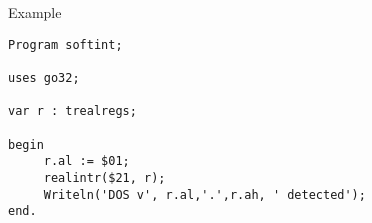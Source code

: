 \begin{FPCList}
\item[Example]
\begin{verbatim}
Program softint;

uses go32;

var r : trealregs;

begin
     r.al := $01;
     realintr($21, r);
     Writeln('DOS v', r.al,'.',r.ah, ' detected');
end.\end{verbatim}
\end{FPCList}